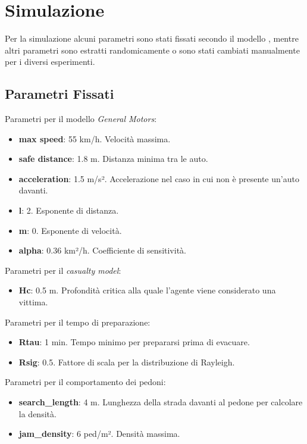 \section{Simulazione}
\label{sec:simulazione}
Per la simulazione alcuni parametri sono stati fissati secondo il modello \parencite{mostafizi2017agent}, mentre altri parametri sono estratti randomicamente 
o sono stati cambiati manualmente per i diversi esperimenti.

\subsection{Parametri Fissati}
\label{ssec:parametri-fissi}

Parametri per il modello \textit{General Motors}:
\begin{itemize}
    \item \textbf{max speed}: 55 km/h. Velocità massima.
    \item \textbf{safe distance}: 1.8 m. Distanza minima tra le auto.
    \item \textbf{acceleration}: 1.5 m/s². Accelerazione nel caso in cui non è presente un'auto davanti.
    \item \textbf{l}: 2. Esponente di distanza.
    \item \textbf{m}: 0. Esponente di velocità.
    \item \textbf{alpha}: 0.36 km²/h. Coefficiente di sensitività. 
\end{itemize}

\noindent
Parametri per il \textit{casualty model}:
\begin{itemize}
  \item \textbf{Hc}: 0.5 m. Profondità critica alla quale l'agente viene considerato una vittima.
\end{itemize}

\noindent
Parametri per il tempo di preparazione:
\begin{itemize}
  \item \textbf{Rtau}: 1 min. Tempo minimo per prepararsi prima di evacuare.
  \item \textbf{Rsig}: 0.5. Fattore di scala per la distribuzione di Rayleigh.
\end{itemize}

\noindent
Parametri per il comportamento dei pedoni:
\begin{itemize}
  \item \textbf{search\_length}: 4 m. Lunghezza della strada davanti al pedone per calcolare la densità.
  \item \textbf{jam\_density}: 6 ped/m². Densità massima.
\end{itemize}

